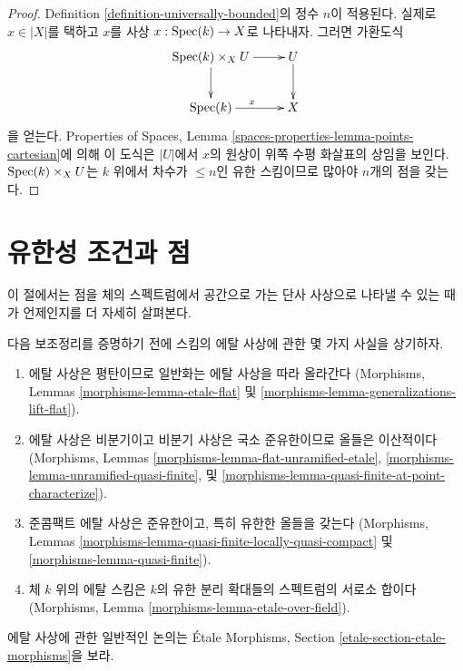 \begin{proof}
Definition \ref{definition-universally-bounded}의 정수 $n$이 적용된다.
실제로 $x \in |X|$를 택하고 $x$를 사상 $x : \mathop{\mathrm{Spec}}(k) \to X$로 나타내자.
그러면 가환도식
$$
\xymatrix{
\Spec(k) \times_X U \ar[r] \ar[d] & U \ar[d] \\
\Spec(k) \ar[r]^x & X
}
$$
을 얻는다. Properties of Spaces, Lemma
\ref{spaces-properties-lemma-points-cartesian}에 의해 이 도식은 $|U|$에서
$x$의 원상이 위쪽 수평 화살표의 상임을 보인다. $\mathop{\mathrm{Spec}}(k) \times_X U$는
$k$ 위에서 차수가 $\leq n$인 유한 스킴이므로 많아야 $n$개의 점을 갖는다.
\end{proof}








\section{유한성 조건과 점}
\label{section-points-monomorphisms}

\noindent
이 절에서는 점을 체의 스펙트럼에서 공간으로 가는 단사 사상으로
나타낼 수 있는 때가 언제인지를 더 자세히 살펴본다.

\begin{remark}
\label{remark-recall}
다음 보조정리를 증명하기 전에 스킴의 에탈 사상에 관한 몇 가지 사실을
상기하자.
\begin{enumerate}
\item 에탈 사상은 평탄이므로 일반화는 에탈 사상을 따라 올라간다
(Morphisms, Lemmas \ref{morphisms-lemma-etale-flat} 및
\ref{morphisms-lemma-generalizations-lift-flat}).
\item 에탈 사상은 비분기이고 비분기 사상은 국소 준유한이므로 올들은
이산적이다(Morphisms, Lemmas
\ref{morphisms-lemma-flat-unramified-etale},
\ref{morphisms-lemma-unramified-quasi-finite}, 및
\ref{morphisms-lemma-quasi-finite-at-point-characterize}).
\item 준콤팩트 에탈 사상은 준유한이고, 특히 유한한 올들을 갖는다
(Morphisms, Lemmas
\ref{morphisms-lemma-quasi-finite-locally-quasi-compact} 및
\ref{morphisms-lemma-quasi-finite}).
\item 체 $k$ 위의 에탈 스킴은 $k$의 유한 분리 확대들의 스펙트럼의
서로소 합이다(Morphisms, Lemma
\ref{morphisms-lemma-etale-over-field}).
\end{enumerate}
에탈 사상에 관한 일반적인 논의는 \'Etale Morphisms, Section
\ref{etale-section-etale-morphisms}을 보라.
\end{remark}

